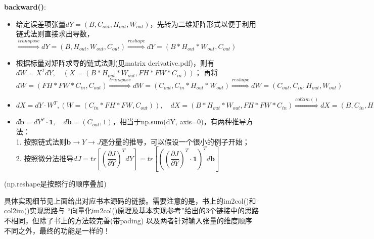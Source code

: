 \documentclass[UTF8]{article}
\begin{document}
    \textbf{backward()}:
    \begin{itemize}
        \item 给定误差项张量$dY=(B,C_{out}, H_{out}, W_{out})$，先转为二维矩阵形式以便于利用链式法则直接求出导数，$\stackrel{transpose}{\Longrightarrow} dY=(B, H_{out}, W_{out}, C_{out})\stackrel{reshape}{\Longrightarrow} dY=(B*H_{out}*W_{out}, C_{out})$
        \item 根据标量对矩阵求导的链式法则(见matrix derivative.pdf)，则有\\ $dW=X^{T}dY,\quad (X=(B*H_{out}*W_{out}, FH*FW*C_{in}))$；
        再将$dW=(FH*FW*C_{in}, C_{out}) \stackrel{transpose}{\Longrightarrow} dW=(C_{out}, C_{in}*H_{out}*W_{out})\stackrel{reshape}{\Longrightarrow} dW=(C_{out}, C_{in}, H_{out}, W_{out})$
        \item $dX=dY\cdot W^{T}, (W=(C_{in}*FH*FW, C_{out})), \quad dX=(B*H_{out}*W_{out}, FH*FW*C_{in}) \stackrel{col2im()}{\Longrightarrow} dX=(B, C_{in}, H, W)$
        \item $d\boldsymbol{b}=dY^{T}\cdot \boldsymbol{1},\quad d\boldsymbol{b}=(C_{out},1)$，相当于np.sum(dY, axis=0)，有两种推导方法：\\
        1. 按照链式法则$\boldsymbol{b}\rightarrow Y \rightarrow J$逐分量的推导，可以假设一个很小的例子开始；
        \\
        2. 按照微分法推导$dJ=tr[(\dfrac{\partial J}{\partial Y})^{T}dY]=tr[((\dfrac{\partial J}{\partial Y})^{T}\cdot \boldsymbol{1})^{T}d\boldsymbol{b}]$
    \end{itemize}
    (np.reshape是按照行的顺序叠加)

    具体实现细节见上面给出对应书本源码的链接。需要注意的是，书上的im2col()和col2im()实现思路与
    “向量化im2col()原理及基本实现参考”给出的3个链接中的思路不相同，但除了书上的方法较完善(带pading)
    以及两者针对输入张量的维度顺序不同之外，最终的功能是一样的！
\end{document}
